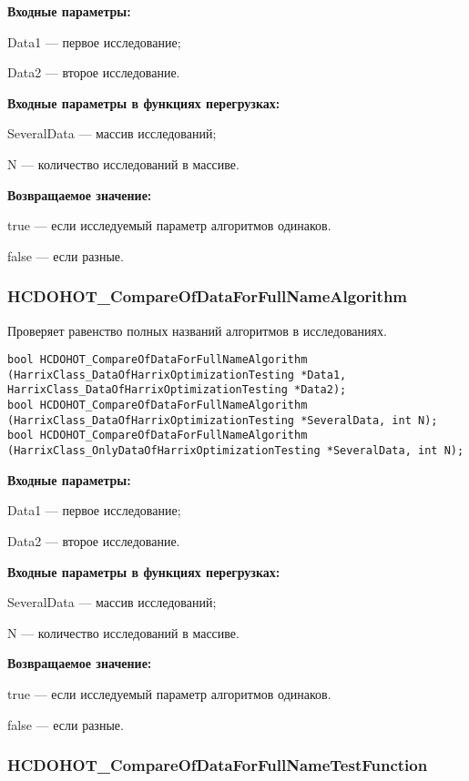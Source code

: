 \documentclass[a4paper,12pt]{article}
\begin{document}
\textbf{Входные параметры:}

Data1 --- первое исследование;

Data2 --- второе исследование.

\textbf{Входные параметры в функциях перегрузках:}

SeveralData --- массив исследований;

N --- количество исследований в массиве.

\textbf{Возвращаемое значение:}

true --- если исследуемый параметр алгоритмов одинаков.

false --- если разные.


\subsubsection{HCDOHOT\_CompareOfDataForFullNameAlgorithm}\label{HCDOHOT_CompareOfDataForFullNameAlgorithm}

Проверяет равенство полных названий алгоритмов в исследованиях.


\begin{lstlisting}[label=code_syntax_HCDOHOT_CompareOfDataForFullNameAlgorithm,caption=Синтаксис]
bool HCDOHOT_CompareOfDataForFullNameAlgorithm (HarrixClass_DataOfHarrixOptimizationTesting *Data1, HarrixClass_DataOfHarrixOptimizationTesting *Data2);
bool HCDOHOT_CompareOfDataForFullNameAlgorithm (HarrixClass_DataOfHarrixOptimizationTesting *SeveralData, int N);
bool HCDOHOT_CompareOfDataForFullNameAlgorithm (HarrixClass_OnlyDataOfHarrixOptimizationTesting *SeveralData, int N);
\end{lstlisting}

\textbf{Входные параметры:}

Data1 --- первое исследование;

Data2 --- второе исследование.

\textbf{Входные параметры в функциях перегрузках:}

SeveralData --- массив исследований;

N --- количество исследований в массиве.

\textbf{Возвращаемое значение:}

true --- если исследуемый параметр алгоритмов одинаков.

false --- если разные.


\subsubsection{HCDOHOT\_CompareOfDataForFullNameTestFunction}\label{HCDOHOT_CompareOfDataForFullNameTestFunction}
\end{document}
